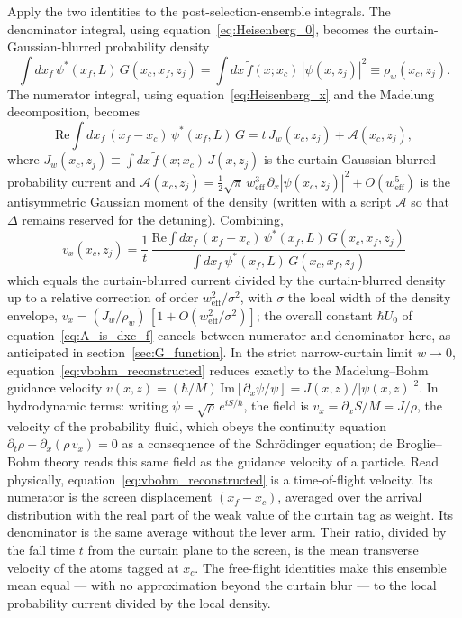 \documentclass[11pt,a4paper]{article}
\begin{document}
Apply the two identities to the post-selection-ensemble integrals. The denominator integral, using equation~\eqref{eq:Heisenberg_0}, becomes the curtain-Gaussian-blurred probability density
\begin{equation}
\int dx_f\,\psi^*(x_f, L)\,G(x_c, x_f, z_j) = \int dx\,\tilde{f}(x; x_c)\,|\psi(x, z_j)|^2 \equiv \rho_w(x_c, z_j).
\label{eq:denominator}
\end{equation}
The numerator integral, using equation~\eqref{eq:Heisenberg_x} and the Madelung decomposition, becomes
\begin{equation}
\mathrm{Re}\!\int dx_f\,(x_f - x_c)\,\psi^*(x_f, L)\,G = t\,J_w(x_c, z_j) + \mathcal{A}(x_c, z_j),
\label{eq:numerator}
\end{equation}
where $J_w(x_c, z_j) \equiv \int dx\,\tilde{f}(x; x_c)\,J(x, z_j)$ is the curtain-Gaussian-blurred probability current and $\mathcal{A}(x_c, z_j) = \tfrac{1}{2}\sqrt{\pi}\,w_\text{eff}^3\,\partial_x|\psi(x_c, z_j)|^2 + O(w_\text{eff}^5)$ is the antisymmetric Gaussian moment of the density (written with a script $\mathcal{A}$ so that $\Delta$ remains reserved for the detuning). Combining,
\begin{equation}
\boxed{\;
v_x(x_c, z_j) = \frac{1}{t}\,\frac{\mathrm{Re}\displaystyle\int dx_f\,(x_f - x_c)\,\psi^*(x_f, L)\,G(x_c, x_f, z_j)}{\displaystyle\int dx_f\,\psi^*(x_f, L)\,G(x_c, x_f, z_j)}
\;}
\label{eq:vbohm_reconstructed}
\end{equation}
which equals the curtain-blurred current divided by the curtain-blurred density up to a relative correction of order $w_\text{eff}^2/\sigma^2$, with $\sigma$ the local width of the density envelope, $v_x = (J_w/\rho_w)\,[1 + O(w_\text{eff}^2/\sigma^2)]$; the overall constant $\hbar U_0$ of equation~\eqref{eq:A_is_dxc_f} cancels between numerator and denominator here, as anticipated in section~\ref{sec:G_function}. In the strict narrow-curtain limit $w \to 0$, equation~\eqref{eq:vbohm_reconstructed} reduces exactly to the Madelung--Bohm guidance velocity $v(x, z) = (\hbar/M)\,\mathrm{Im}[\partial_x\psi/\psi] = J(x, z)/|\psi(x, z)|^2$. In hydrodynamic terms: writing $\psi = \sqrt{\rho}\,e^{iS/\hbar}$, the field is $v_x = \partial_x S/M = J/\rho$, the velocity of the probability fluid, which obeys the continuity equation $\partial_t\rho + \partial_x(\rho\,v_x) = 0$ as a consequence of the Schr\"odinger equation; de Broglie--Bohm theory reads this same field as the guidance velocity of a particle. Read physically, equation~\eqref{eq:vbohm_reconstructed} is a time-of-flight velocity. Its numerator is the screen displacement $(x_f - x_c)$, averaged over the arrival distribution with the real part of the weak value of the curtain tag as weight. Its denominator is the same average without the lever arm. Their ratio, divided by the fall time $t$ from the curtain plane to the screen, is the mean transverse velocity of the atoms tagged at $x_c$. The free-flight identities make this ensemble mean equal --- with no approximation beyond the curtain blur --- to the local probability current divided by the local density.
\end{document}
